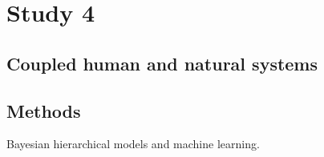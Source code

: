 
\section{Study 4}

\subsection{Coupled human and natural systems}



\subsection{Methods}

Bayesian hierarchical models and machine learning.
